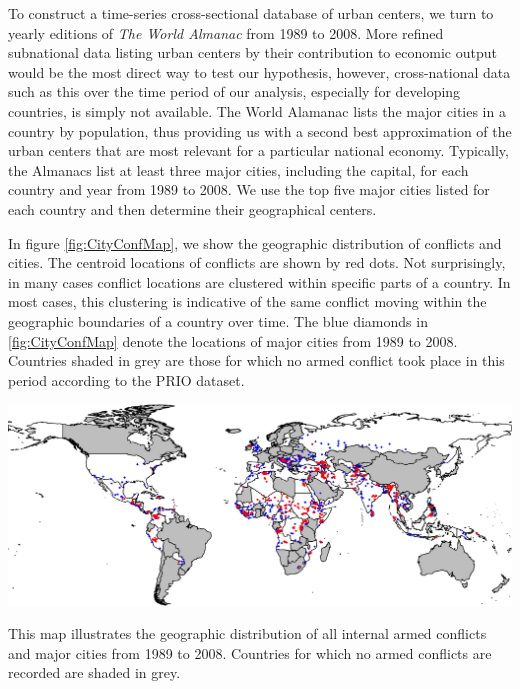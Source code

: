 To construct a time-series cross-sectional database of urban centers, we turn to yearly editions of \emph{The World Almanac} from 1989 to 2008. More refined subnational data listing urban centers by their contribution to economic output would be the most direct way to test our hypothesis, however, cross-national data such as this over the time period of our analysis, especially for developing countries, is simply not available. The World Alamanac lists the major cities in a country by population, thus providing us with a second best approximation of the urban centers that are most relevant for a particular national economy. Typically, the Almanacs list at least three major cities, including the capital, for each country and year from 1989 to 2008. We use the top five major cities listed for each country and then determine their geographical centers.


In figure \ref{fig:CityConfMap}, we show the geographic distribution of conflicts and cities. The centroid locations of conflicts are shown by red dots. Not surprisingly, in many cases conflict locations are clustered within specific parts of a country. In most cases, this clustering is indicative of the same conflict moving within the geographic boundaries of a country over time. The blue diamonds in \ref{fig:CityConfMap} denote the locations of major cities from 1989 to 2008. Countries shaded in grey are those for which no armed conflict took place in this period according to the PRIO dataset.  

\begin{amssidewaysfigure}
	\centering
	\includegraphics[width=1\textwidth]{CityConfMap-crop}
	\caption{This map illustrates the geographic distribution of all internal armed conflicts and major cities from 1989 to 2008. Countries for which no armed conflicts are recorded are shaded in grey.}
	\label{fig:CityConfMap}
\end{amssidewaysfigure}
\FloatBarrier

